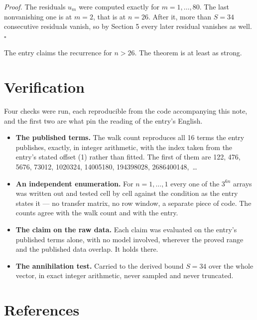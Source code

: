 \documentclass[11pt]{article}
\theoremstyle{definition}
\begin{document}
{\itshape Proof.} The residuals $u_m$ were computed exactly for $m = 1,\dots,80$. The last nonvanishing one is at $m = 2$, that is at $n = 26$. After it, more than $S = 34$ consecutive residuals vanish, so by Section 5 every later residual vanishes as well. $\square$

The entry claims the recurrence for $n > 26$. The theorem is at least as strong.

\section{Verification}

Four checks were run, each reproducible from the code accompanying this note, and the first two are what pin the reading of the entry's English.

\begin{itemize}

\item {\bfseries The published terms.} The walk count reproduces all 16 terms the entry publishes, exactly, in integer arithmetic, with the index taken from the entry's stated offset (1) rather than fitted. The first of them are 122, 476, 5676, 73012, 1020324, 14005180, 194398028, 2686400148,~\dots

\item {\bfseries An independent enumeration.} For $n = 1,\dots,1$ every one of the $3^{6n}$ arrays was written out and tested cell by cell against the condition as the entry states it --- no transfer matrix, no row window, a separate piece of code. The counts agree with the walk count and with the entry.

\item {\bfseries The claim on the raw data.} Each claim was evaluated on the entry's published terms alone, with no model involved, wherever the proved range and the published data overlap. It holds there.

\item {\bfseries The annihilation test.} Carried to the derived bound $S = 34$ over the whole vector, in exact integer arithmetic, never sampled and never truncated.

\end{itemize}

\section{References}
\end{document}
